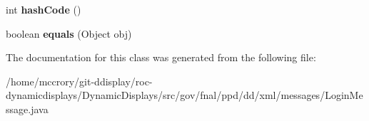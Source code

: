 \begin{DoxyCompactItemize}
\item 
\hypertarget{classgov_1_1fnal_1_1ppd_1_1dd_1_1xml_1_1messages_1_1LoginMessage_af1b944576e143ba9f5682d9830708c30}{int {\bfseries hash\-Code} ()}\label{classgov_1_1fnal_1_1ppd_1_1dd_1_1xml_1_1messages_1_1LoginMessage_af1b944576e143ba9f5682d9830708c30}

\item 
\hypertarget{classgov_1_1fnal_1_1ppd_1_1dd_1_1xml_1_1messages_1_1LoginMessage_aba9b26e474436d61829f45040baaa43a}{boolean {\bfseries equals} (Object obj)}\label{classgov_1_1fnal_1_1ppd_1_1dd_1_1xml_1_1messages_1_1LoginMessage_aba9b26e474436d61829f45040baaa43a}

\end{DoxyCompactItemize}


The documentation for this class was generated from the following file\-:\begin{DoxyCompactItemize}
\item 
/home/mccrory/git-\/ddisplay/roc-\/dynamicdisplays/\-Dynamic\-Displays/src/gov/fnal/ppd/dd/xml/messages/Login\-Message.\-java\end{DoxyCompactItemize}
